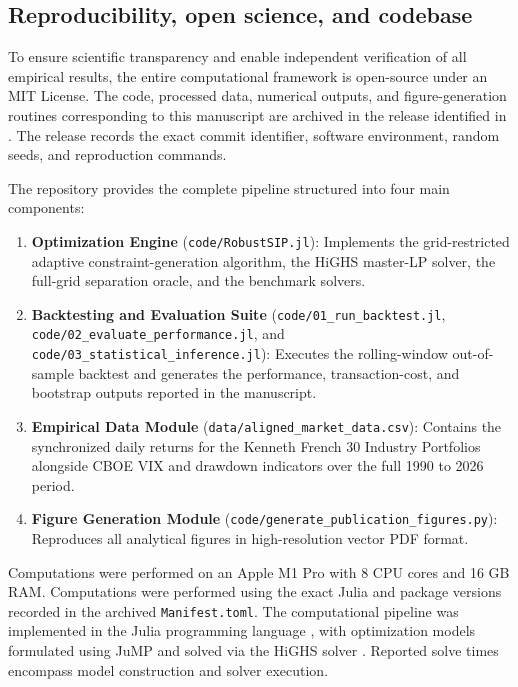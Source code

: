 \documentclass[smallextended]{svjour3}
\begin{document}
\subsection{Reproducibility, open science, and codebase}
To ensure scientific transparency and enable independent verification of all empirical results, the entire computational framework is open-source under an MIT License. The code, processed data, numerical outputs, and figure-generation routines
corresponding to this manuscript are archived in the release
identified in \citet{bezoui2026robust}. The release records the exact commit
identifier, software environment, random seeds, and reproduction commands.

The repository provides the complete pipeline structured into four main components:
\begin{enumerate}
    \item \textbf{Optimization Engine} (\texttt{code/RobustSIP.jl}): Implements the grid-restricted adaptive constraint-generation algorithm, the HiGHS master-LP solver, the full-grid separation oracle, and the benchmark solvers.
    \item \textbf{Backtesting and Evaluation Suite}
(\texttt{code/01\_run\_backtest.jl}, \texttt{code/02\_evaluate\_performance.jl}, and \texttt{code/03\_statistical\_inference.jl}): Executes the rolling-window
out-of-sample backtest and generates the performance, transaction-cost,
and bootstrap outputs reported in the manuscript.

    \item \textbf{Empirical Data Module} (\texttt{data/aligned\_market\_data.csv}): Contains the synchronized daily returns for the Kenneth French 30 Industry Portfolios \cite{french2026data} alongside CBOE VIX and drawdown indicators over the full 1990 to 2026 period.
    \item \textbf{Figure Generation Module} (\texttt{code/generate\_publication\_figures.py}): Reproduces all analytical figures in high-resolution vector PDF format.
\end{enumerate}

Computations were performed on an Apple M1 Pro with 8 CPU cores and 16 GB RAM. Computations were performed using the exact Julia and package versions recorded in the archived \texttt{Manifest.toml}. The computational pipeline was implemented in the Julia programming language \cite{bezanson2017julia}, with optimization models formulated using JuMP \cite{dunning2017jump} and solved via the HiGHS solver \cite{highs2022}. Reported solve times encompass model construction and solver execution.
\end{document}
